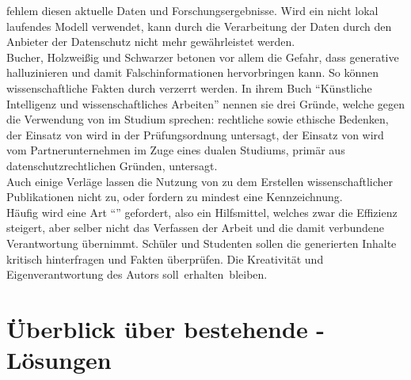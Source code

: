 \documentclass[../main.tex]{subfiles}
\begin{document}
fehlem diesen aktuelle Daten und Forschungsergebnisse. Wird ein nicht lokal laufendes Modell verwendet, kann durch die Verarbeitung der Daten durch den  Anbieter
der Datenschutz nicht mehr gewährleistet werden.\cite{ZukunftWissenschaftlichesPublizieren} \\ Bucher, Holzweißig und Schwarzer betonen vor allem die Gefahr, dass 
generative  halluzinieren und damit Falschinformationen hervorbringen kann. So können wissenschaftliche Fakten durch  verzerrt werden. In ihrem Buch "`Künstliche Intelligenz und wissenschaftliches Arbeiten"' nennen sie drei 
Gründe, welche gegen die Verwendung von  im Studium sprechen: rechtliche sowie ethische Bedenken, der Einsatz von  wird in der Prüfungsordnung untersagt, 
der Einsatz von  wird vom Partnerunternehmen im Zuge eines dualen Studiums, primär aus datenschutzrechtlichen Gründen, untersagt.\cite{BucherSchwarzerHolzwweißig} \\Auch einige Verläge lassen 
die Nutzung von  zu dem Erstellen wissenschaftlicher Publikationen nicht zu, oder fordern zu mindest eine Kennzeichnung\cite{ZukunftWissenschaftlichesPublizieren}.\\ 
Häufig wird eine Art "`"' gefordert, also ein Hilfsmittel, welches zwar die Effizienz steigert, aber selber nicht das Verfassen der 
Arbeit und die damit verbundene Verantwortung übernimmt. Schüler und Studenten sollen die generierten Inhalte kritisch hinterfragen und Fakten überprüfen. Die Kreativität und 
Eigenverantwortung des Autors \mbox{soll erhalten bleiben. \cite{BucherSchwarzerHolzwweißig,humanWritingToAi,teachers,ZukunftWissenschaftlichesPublizieren}} 

\section{Überblick über bestehende -Lösungen}
\label{sec:bereitsBestehendeLoesungen}
\end{document}
